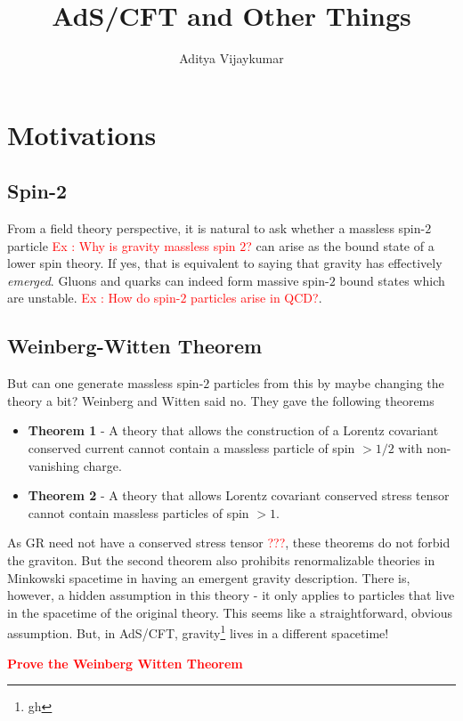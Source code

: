 \documentclass[a4paper,11pt]{article}
\title{\textbf{AdS/CFT and Other Things}}
\author{Aditya Vijaykumar}
\affiliation{International Centre for Theoretical Sciences, Bengaluru, India.}
\begin{document}
\maketitle
\section{Motivations}
\subsection{Spin-2}

From a field theory perspective, it is natural to ask whether a massless spin-$2$ particle \textcolor{red}{Ex : Why is gravity massless spin $ 2 $?} can arise as the bound state of a lower spin theory. If yes, that is equivalent to saying that gravity has effectively \textit{emerged}. Gluons and quarks can indeed form massive spin-$ 2 $ bound states which are unstable. \textcolor{red}{Ex : How do spin-$2$ particles arise in QCD?}.
\subsection{Weinberg-Witten Theorem}

But can one generate massless spin-$ 2 $ particles from this by maybe changing the theory a bit? Weinberg and Witten said no. They gave the following theorems

\begin{itemize}
	
	\item \textbf{Theorem 1} - A theory that allows the construction of a Lorentz covariant conserved current cannot contain a massless particle of spin $  > 1/2 $ with non-vanishing charge.
	\item \textbf{Theorem 2} - A theory that allows Lorentz covariant conserved stress tensor cannot contain massless particles of spin $ >1 $.
\end{itemize}
As GR need not have a conserved stress tensor \textcolor{red}{???}, these theorems do not forbid the graviton. But the second theorem also prohibits renormalizable theories in Minkowski spacetime in having an emergent gravity description. There is, however, a hidden assumption in this theory - it only applies to particles that live in the spacetime of the original theory. This seems like a straightforward, obvious assumption. But, in AdS/CFT, gravity\footnote{gh} lives in a different spacetime!

\textbf{\textcolor{red}{{Prove the Weinberg Witten Theorem}}}
\end{document}
